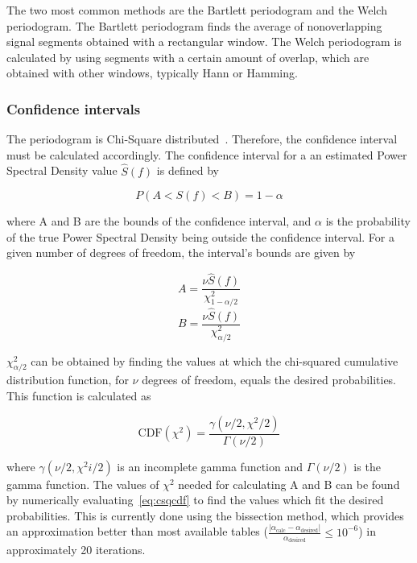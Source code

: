 \begin{refsection}
The two most common methods are the Bartlett periodogram and the Welch
periodogram. The Bartlett periodogram finds the average of nonoverlapping
signal segments obtained with a rectangular window. The Welch periodogram is
calculated by using segments with a certain amount of overlap, which are
obtained with other windows, typically Hann or Hamming.

\subsubsection*{Confidence intervals}
The periodogram is Chi-Square distributed~\cite{jeruchim06}. Therefore, the confidence interval
must be calculated accordingly. The confidence interval for a an estimated Power Spectral Density
value $\hat{S}(f)$ is defined by~\cite{nsapplication255}

\begin{equation*}
	P\left( A < S(f) < B \right) = 1 - \alpha
\end{equation*}

\noindent where A and B are the bounds of the confidence interval, and $\alpha$ is the
probability of the true Power Spectral Density being outside the confidence interval. For a
given number of degrees of freedom, the interval's bounds are given by 

\begin{equation*}\label{eq:chsqBoundA}
	A = \frac{\nu \hat{S}(f)}{\chi^2_{1-\alpha/2}}
\end{equation*}
\begin{equation*}\label{eq:chsqBoundB}
	B = \frac{\nu \hat{S}(f)}{\chi^2_{\alpha/2}}
\end{equation*}

$\chi^2_{\alpha/2}$ can be obtained by finding the values at which the
chi-squared cumulative distribution function, for $\nu$ degrees of freedom, equals the desired 
probabilities. This function is calculated as~\cite{weisstein18csd}

\begin{equation}\label{eq:csqcdf}
	\text{CDF}(\chi^2) = \frac{\gamma \left(\nu/2, \chi^2/2\right)}
	{\Gamma\left(\nu/2\right)}
\end{equation}

\noindent where $\gamma\left(\nu/2,\chi^2i/2\right)$ is an incomplete gamma function and
	$\Gamma(\nu/2)$ is the gamma function. The values of $\chi^2$ needed for
	calculating A and B can be found by numerically evaluating~\ref{eq:csqcdf}
	to find the values which fit the desired probabilities. This is currently
	done using the bissection method, which provides an approximation better
	than most available tables 
	($\frac{|\alpha_{\text{calc}}-\alpha_{\text{desired}}|}{\alpha_{\text{desired}}}
	\le 10^{-6}$) in approximately 20 iterations.


\end{refsection}
